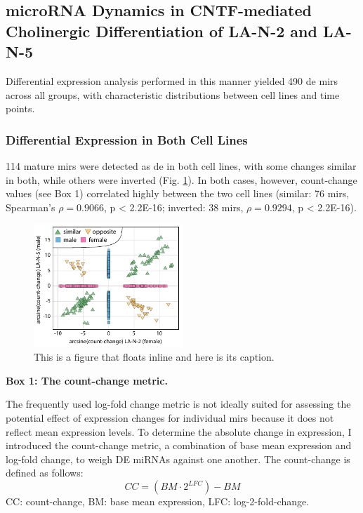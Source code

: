 \subsection{microRNA Dynamics in CNTF-mediated Cholinergic Differentiation of LA-N-2 and LA-N-5}
Differential expression analysis performed in this manner yielded 490 \ac{de} \acp{mir} across all groups, with characteristic distributions between cell lines and time points. 

\subsubsection{Differential Expression in Both Cell Lines}


114 mature \acp{mir} were detected as \ac{de} in both cell lines, with some changes similar in both, while others were inverted (Fig. \ref{fig:countchangecor}). In both cases, however, count-change values (see Box 1) correlated highly between the two cell lines (similar: 76 \acp{mir}, Spearman’s $\rho = 0.9066$, p < 2.2E-16; inverted: 38 \acp{mir}, $\rho = 0.9294$, p < 2.2E-16).

\begin{figure}
\centering
\includegraphics[width=0.5\textwidth]{figures/countchangecor}
\caption[Short figure name.]{This is a figure that floats inline and here is its caption.
\label{fig:countchangecor}}
\end{figure}

\begin{shaded}
\textbf{Box 1: The count-change metric.}

The frequently used log-fold change metric is not ideally suited for assessing the potential effect of expression changes for individual \acp{mir} because it does not reflect mean expression levels. To determine the absolute change in expression, I introduced the count-change metric, a combination of base mean expression and log-fold change, to weigh DE miRNAs against one another. The count-change is defined as follows: $$CC = (BM \cdot 2^{LFC}) - BM$$
CC: count-change, BM: base mean expression, LFC: log-2-fold-change.
\end{shaded}


